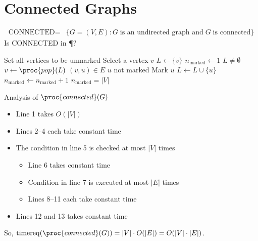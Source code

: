 \documentclass[a4paper]{report}
\newcommand{\bookref}[3]{\marginpar{\faBook{}~#1\\Chapter #2\\Section #3}}
\theoremstyle{definition}
\DeclareMathOperator*{\treq}{timereq}
\begin{document}
\section{Connected Graphs}
\bookref{ER}{28}{28.1.4}
\vspace{-0.3cm}%
\begin{align*}
\text{CONNECTED} =& \{G = (V,E) : G \; \text{is an undirected graph and} \; G \; \text{is connected}\}
\end{align*}
%
Is CONNECTED in \P?

% 

\begin{codebox}
\li Set all vertices to be unmarked
\li Select a vertex $v$
\li $L \gets \{v\}$
\li $n_{\text{marked}} \gets 1$
\li \While $L \neq \emptyset$ \Do
  \li $v \gets \proc{pop}(L)$
  \li \For $(v,u) \in E$ \Do
    \li \If $u$ not marked \Do
      \li Mark $u$
      \li $L \gets L \cup \{u\}$
      \li $n_{\text{marked}} \gets n_{\text{marked}} + 1$
    \End
  \End
\End
\li \If $n_{\text{marked}} = |V|$
\li \Then \Return {}
\End
\li \Return {}
\end{codebox}

Analysis of $\proc{connected}(G)$

\begin{itemize}
\item Line 1 takes $O(|V|)$
\item Lines 2--4 each take constant time
\item The condition in line 5 is checked at most $|V|$ times
\begin{itemize}
\item Line 6 takes constant time
\item Condition in line 7 is executed at most $|E|$ times %
\item Lines 8--11 each take constant time
\end{itemize}
\item Lines 12 and 13 takes constant time
\end{itemize}

So, $\treq(\proc{connected}(G)) = |V| \cdot O(|E|) = O(|V|\cdot|E|)$.  
\end{document}
